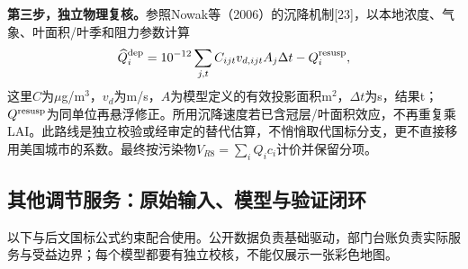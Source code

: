 \documentclass[12pt,a4paper,fontset=fandol]{ctexart}
\begin{document}
\textbf{第三步，独立物理复核。}参照Nowak等（2006）的沉降机制[23]，以本地浓度、气象、叶面积/叶季和阻力参数计算
\begin{equation}
 \widehat Q_i^{\rm dep}=10^{-12}\sum_{j,t}C_{ijt}v_{d,ijt}A_j\Delta t-Q_i^{\rm resusp},
\end{equation}
这里$C$为$\mu$g/m$^3$，$v_d$为m/s，$A$为模型定义的有效投影面积m$^2$，$\Delta t$为s，结果t；$Q^{\rm resusp}$为同单位再悬浮修正。所用沉降速度若已含冠层/叶面积效应，不再重复乘LAI。此路线是独立校验或经审定的替代估算，不悄悄取代国标分支，更不直接移用美国城市的系数。最终按污染物$V_{R8}=\sum_iQ_i c_i$计价并保留分项。

\subsection{其他调节服务：原始输入、模型与验证闭环}
以下与后文国标公式约束配合使用。公开数据负责基础驱动，部门台账负责实际服务与受益边界；每个模型都要有独立校核，不能仅展示一张彩色地图。
\end{document}
